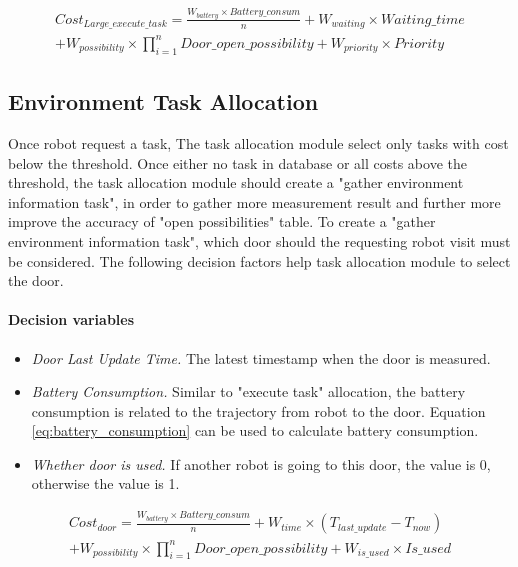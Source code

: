 \begin{equation}
	\label{eq:large_execute_task_cost}
	\begin{split}
	Cost_{Large\_execute\_task} = \frac{W_{battery} \times Battery\_consum}{n} + W_{waiting} \times Waiting\_time \\
	+ W_{possibility} \times \prod\limits_{i=1}^n Door\_open\_possibility  + W_{priority} \times Priority
	\end{split}
\end{equation}


\subsection{Environment Task Allocation}
Once robot request a task, The task allocation module select only tasks with cost below the threshold. Once either no task in database or all costs above the threshold, 
the task allocation module should create a "gather environment information task", in order to gather more measurement result and further more improve the accuracy of "open possibilities" table.
To create a "gather environment information task", which door should the requesting robot visit must be considered. The following decision factors help task allocation module to select the door.

\paragraph*{Decision variables}
\begin{itemize}
	\item \textsl{Door Last Update Time.} The latest timestamp when the door is measured.
	\item \textsl{Battery Consumption.} Similar to "execute task" allocation, the battery consumption is related to the trajectory from robot to the door. Equation \ref{eq:battery_consumption} can be used to calculate battery consumption.
	\item \textsl{Whether door is used.} If another robot is going to this door, the value is 0, otherwise the value is 1.
\end{itemize}

\begin{equation}
	\label{eq:door_cost}
	\begin{split}
	Cost_{door} = \frac{W_{battery} \times Battery\_consum}{n} + W_{time} \times (T_{last\_update} - T_{now}) \\
	+ W_{possibility} \times \prod\limits_{i=1}^n Door\_open\_possibility + W_{is\_used} \times Is\_used  
	\end{split}
\end{equation}

